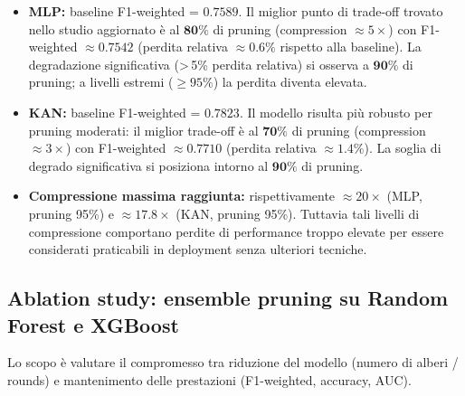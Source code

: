 \documentclass[a4paper,12pt]{report}
\begin{document}
	\begin{itemize}
		\item \textbf{MLP:} baseline F1-weighted = \(\mathbf{0.7589}\). Il miglior punto di trade-off trovato nello studio aggiornato è al \(\mathbf{80\%}\) di pruning (compression \(\approx 5\times\)) con F1-weighted \(\approx 0.7542\) (perdita relativa \(\approx 0.6\%\) rispetto alla baseline). La degradazione significativa (>\,5\% perdita relativa) si osserva a \(\mathbf{90\%}\) di pruning; a livelli estremi (\(\ge 95\%\)) la perdita diventa elevata.
		\item \textbf{KAN:} baseline F1-weighted = \(\mathbf{0.7823}\). Il modello risulta più robusto per pruning moderati: il miglior trade-off è al \(\mathbf{70\%}\) di pruning (compression \(\approx 3\times\)) con F1-weighted \(\approx 0.7710\) (perdita relativa \(\approx 1.4\%\)). La soglia di degrado significativa si posiziona intorno al \(\mathbf{90\%}\) di pruning.
		\item \textbf{Compressione massima raggiunta:} rispettivamente \(\approx 20\times\) (MLP, pruning 95\%) e \(\approx 17.8\times\) (KAN, pruning 95\%). Tuttavia tali livelli di compressione comportano perdite di performance troppo elevate per essere considerati praticabili in deployment senza ulteriori tecniche.
	\end{itemize}
	
	\subsection{Ablation study: ensemble pruning su Random Forest e XGBoost}
	Lo scopo è valutare il compromesso tra riduzione del modello (numero di alberi / rounds) e mantenimento delle prestazioni (F1-weighted, accuracy, AUC).
	
\end{document}
